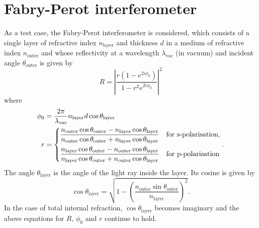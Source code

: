 \documentclass[]{article}
\begin{document}
	\section{Fabry-Perot interferometer}
	As a test case, the Fabry-Perot interferometer is considered, which consists of a single layer of refractive index $n_\text{layer}$ and thickness $d$ in a medium of refractive index $n_\text{outer}$ and whose reflectivity at a wavelength $\lambda_\text{vac}$ (in vacuum) and incident angle $\theta_\text{outer}$ is given by
	\begin{equation}
		R=\left|\frac{r(1-e^{2i\phi_0})}{1-r^2 e^{2i\phi_0}}\right|^2
	\end{equation}
	where 
	\begin{align}
		\phi_0&=\frac{2\pi}{\lambda_\text{vac}}n_\text{layer}d\cos\theta_\text{layer}\\
		r&=
		\begin{dcases}
		\frac{n_\text{outer}\cos\theta_\text{outer}-n_\text{layer}\cos\theta_\text{layer}}{n_\text{outer}\cos\theta_\text{outer}+n_\text{layer}\cos\theta_\text{layer}}&\text{for s-polarisation},\\
		\frac{n_\text{layer}\cos\theta_\text{outer}-n_\text{outer}\cos\theta_\text{layer}}{n_\text{layer}\cos\theta_\text{outer}+n_\text{outer}\cos\theta_\text{layer}}&\text{for p-polarisation}
		\end{dcases}.
	\end{align}
	The angle $\theta_\text{layer}$ is the angle of the light ray inside the layer. Its cosine is given by
	\begin{equation}
		\cos\theta_\text{layer}=\sqrt{1-\left(\frac{n_\text{outer}\sin\theta_\text{outer}}{n_\text{layer}}\right)^2}.
	\end{equation}
	In the case of total internal refraction, $\cos\theta_\text{layer}$ becomes imaginary and the above equations for $R$, $\phi_0$ and $r$ continue to hold.
	
%	
%	
	
\end{document}
